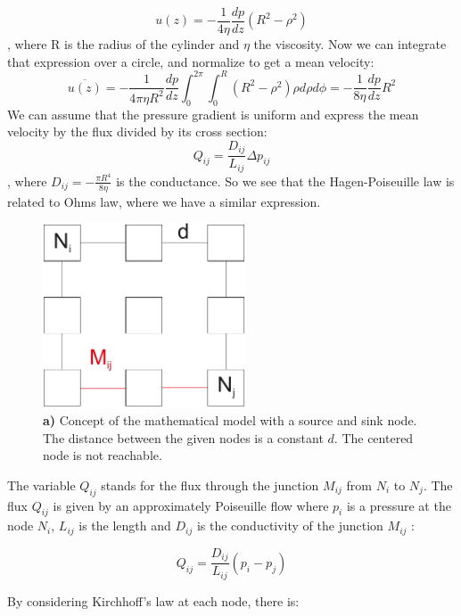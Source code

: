 \documentclass[11pt]{scrartcl}
\begin{document}
\begin{equation}
u(z)=-\frac{1}{4\eta}\frac{dp}{dz}(R^2-\rho^2)
\end{equation}
, where R is the radius of the cylinder and $\eta$ the viscosity. Now we can integrate that expression over a circle, and normalize to get a mean velocity:
\begin{equation}
\overline{u(z)}=-\frac{1}{4\pi\eta R^2}\frac{dp}{dz}\int_{0}^{2\pi}\int_{0}^{R}{(R^2-\rho^2)}\rho d\rho d\phi=-\frac{1}{8\eta}\frac{dp}{dz}R^2
\end{equation}
We can assume that the pressure gradient is uniform and express the mean velocity by the flux divided by its cross section:
\begin{equation}
Q_{ij}=\frac{D_{ij}}{L_{ij}}\Delta p_{ij}
\end{equation}
, where $D_{ij}=-\frac{\pi R^4}{8\eta}$ is the conductance. So we see that the Hagen-Poiseuille law is related to Ohms law, where we have a similar expression.
\begin{figure}[H]
	\centering
	\includegraphics[width=6cm]{figures/figure1}
	\caption{\textbf{a)} Concept of the mathematical model with a source and sink node. The distance between the given nodes is a constant $d$. The centered node is not reachable.}
	\label{fig:schema}
\end{figure}

The variable $Q_{ij}$ stands for the flux through the junction $M_{ij}$ from $N_i$ to $N_j$. The flux $Q_{ij}$ is given by an approximately Poiseuille flow where $p_i$ is a pressure at the node $N_i$, $L_{ij}$ is the length and $D_{ij}$ is the conductivity of the junction $M_{ij}$ :

\begin{equation}
	\label{eq:1}
	Q_{ij}=\frac{D_{ij}}{L_{ij}}\left(p_i-p_j\right)
\end{equation}

By considering Kirchhoff's law at each node, there is:
\end{document}
